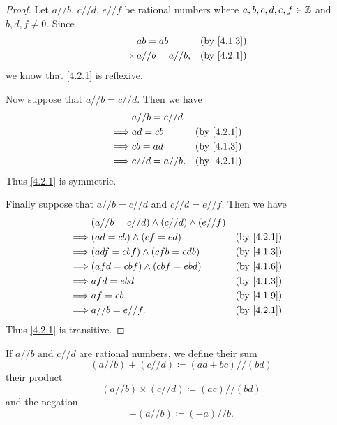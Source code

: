 \begin{proof}
  Let \(a // b\), \(c // d\), \(e // f\) be rational numbers where \(a, b, c, d, e, f \in \mathbb{Z}\) and \(b, d, f \neq 0\).
  Since
  \begin{align*}
             & ab = ab          &  & \by{4.1.3} \\
    \implies & a // b = a // b, &  & \by{4.2.1}
  \end{align*}
  we know that \cref{4.2.1} is reflexive.

  Now suppose that \(a // b = c // d\).
  Then we have
  \begin{align*}
             & a // b = c // d                  \\
    \implies & ad = cb          &  & \by{4.2.1} \\
    \implies & cb = ad          &  & \by{4.1.3} \\
    \implies & c // d = a // b. &  & \by{4.2.1}
  \end{align*}
  Thus \cref{4.2.1} is symmetric.

  Finally suppose that \(a // b = c // d\) and \(c // d = e // f\).
  Then we have
  \begin{align*}
             & (a // b = c // d) \land (c // d) \land (e // f)                 \\
    \implies & (ad = cb) \land (cf = ed)                       &  & \by{4.2.1} \\
    \implies & (adf = cbf) \land (cfb = edb)                   &  & \by{4.1.3} \\
    \implies & (afd = cbf) \land (cbf = ebd)                   &  & \by{4.1.6} \\
    \implies & afd = ebd                                       &  & \by{4.1.3} \\
    \implies & af = eb                                         &  & \by{4.1.9} \\
    \implies & a // b = e // f.                                &  & \by{4.2.1}
  \end{align*}
  Thus \cref{4.2.1} is transitive.
\end{proof}

\begin{defn}\label{4.2.2}
  If \(a // b\) and \(c // d\) are rational numbers, we define their sum
  \[
    (a // b) + (c // d) \coloneqq (ad + bc) // (bd)
  \]
  their product
  \[
    (a // b) \times (c // d) \coloneqq (ac) // (bd)
  \]
  and the negation
  \[
    -(a // b) \coloneqq (-a) // b.
  \]
\end{defn}


